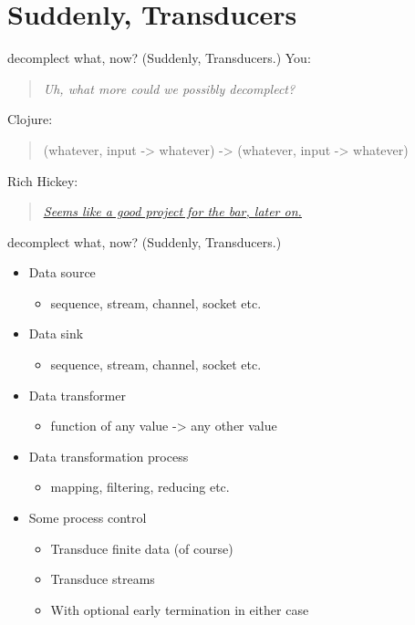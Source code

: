 \documentclass[presentation]{beamer}
\begin{document}
\section{Suddenly, Transducers}
\label{sec:orgc14b7fb}
\begin{frame}[label={sec:org3b5440c}]{decomplect what, now? (Suddenly, Transducers.)}
You:
\begin{quote}
\emph{Uh, what more could we possibly decomplect?}
\end{quote}
Clojure:
\begin{quote}
(whatever, input -> whatever) -> (whatever, input -> whatever)
\end{quote}
Rich Hickey:
\begin{quote}
\uline{\emph{\href{https://www.youtube.com/watch?v=6mTbuzafcII\&t=1677s}{Seems like a good project for the bar, later on.}}}
\end{quote}
\end{frame}
\begin{frame}[label={sec:org9842793}]{decomplect what, now? (Suddenly, Transducers.)}
\begin{itemize}
\item Data source
\begin{itemize}
\item sequence, stream, channel, socket etc.
\end{itemize}
\item Data sink
\begin{itemize}
\item sequence, stream, channel, socket etc.
\end{itemize}
\item Data transformer
\begin{itemize}
\item function of any value -> any other value
\end{itemize}
\item Data transformation process
\begin{itemize}
\item mapping, filtering, reducing etc.
\end{itemize}
\item Some process control
\begin{itemize}
\item Transduce finite data (of course)
\item Transduce streams
\item With optional early termination in either case
\end{itemize}
\end{itemize}
\end{frame}
\end{document}
